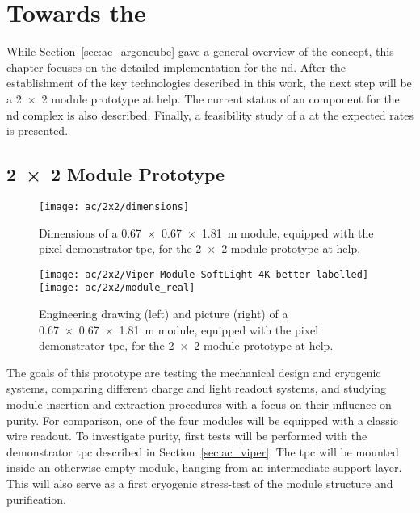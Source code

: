 \chapter{Towards the  }
\label{chap:dune-nd}

While Section~\ref{sec:ac_argoncube} gave a general overview of the \AC{} concept, this chapter focuses on the detailed implementation for the \dune{} \gls{nd}.
After the establishment of the key technologies described in this work, the next step will be a \num{2 x 2} module prototype at \gls{help}.
The current status of an \AC{} \lartpc{} component for the \dune{} \gls{nd} complex is also described.
Finally, a feasibility study of a \lartpc{} at the expected rates is presented.


\section{\num{2 x 2} Module \AC{} Prototype}
\label{sec:dune-nd_ac-2x2}

\begin{figure}[htb]
	\centering
	\texttt{[image: ac/2x2/dimensions]}
	\caption[\AC{} \num{2 x 2} prototype module dimensions]{%
		Dimensions of a \SI{0.67 x 0.67 x 1.81}{\metre} module, equipped with the pixel demonstrator \acrshort{tpc}, for the \num{2 x 2} module \AC{} prototype at \acrshort{help}.
	}
	\label{fig:2x2_dim}
\end{figure}

\begin{figure}[htb]
	\centering
	\texttt{[image: ac/2x2/Viper-Module-SoftLight-4K-better\_labelled]}
	\texttt{[image: ac/2x2/module\_real]}
	\caption[\AC{} \num{2 x 2} prototype module]{%
		Engineering drawing (left) and picture (right) of a \SI{0.67 x 0.67 x 1.81}{\metre} module, equipped with the pixel demonstrator \acrshort{tpc}, for the \num{2 x 2} module \AC{} prototype at \acrshort{help}.
	}
	\label{fig:2x2_mod}
\end{figure}

The goals of this prototype are testing the mechanical design and cryogenic systems, comparing different charge and light readout systems, and studying module insertion and extraction procedures with a focus on their influence on purity.
For comparison, one of the four modules will be equipped with a classic wire readout.
To investigate purity, first tests will be performed with the \AC{} demonstrator \gls{tpc} described in Section~\ref{sec:ac_viper}.
The \gls{tpc} will be mounted inside an otherwise empty module, hanging from an intermediate support layer.
This will also serve as a first cryogenic stress-test of the module structure and \lar{} purification.

